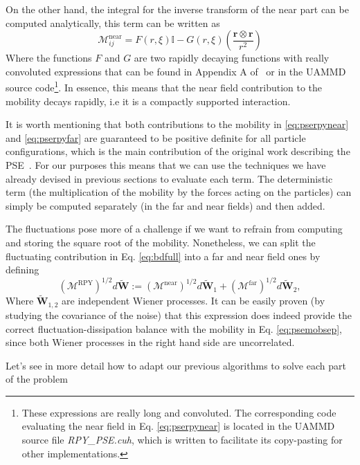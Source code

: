 \documentclass[twoside,openright,titlepage,numbers=noenddot,%
headinclude,footinclude,cleardoublepage=empty,abstract=on,
BCOR=5mm,fontsize=11pt, dvipsnames, paper=b5
]{scrreprt}
\renewcommand{\vec}[1]{\bm{#1}}
\newcommand{\tens}[1]{\bm{\mathcal{#1}}}
\newcommand{\uammd}{\gls{UAMMD}\xspace}
\newcommand{\near}{\textrm{near}}
\newcommand{\far}{\textrm{far}}
\newcommand{\noise}{\widetilde{W}}
\begin{document}
On the other hand, the integral for the inverse transform of the near part can be computed analytically, this term can be written as
\begin{equation}
  \label{eq:pserpynear}
  \tens{M}_{ij}^{\near}= F(r,\xi)\mathbb I - G(r,\xi)\left(\frac{\vec{r}\otimes\vec{r}}{r^2}\right)
\end{equation}
Where the functions $F$ and $G$ are two rapidly decaying functions with really convoluted expressions that can be found in Appendix A of~\cite{Fiore2017} or in the \uammd source code\footnote{These expressions are really long and convoluted. The corresponding code evaluating the near field in Eq. \eqref{eq:pserpynear} is located in the \uammd source file \emph{RPY\_PSE.cuh}, which is written to facilitate its copy-pasting for other implementations.}. In essence, this means that the near field contribution to the mobility decays rapidly, i.e it is a compactly supported interaction.

It is worth mentioning that both contributions to the mobility in \eqref{eq:pserpynear} and \eqref{eq:pserpyfar} are guaranteed to be positive definite for all particle configurations, which is the main contribution of the original work describing the \gls{PSE}~\cite{Fiore2017}.
For our purposes this means that we can use the techniques we have already devised in previous sections to evaluate each term. The deterministic term (the multiplication of the mobility by the forces acting on the particles) can simply be computed separately (in the far and near fields) and then added.

The fluctuations pose more of a challenge if we want to refrain from computing and storing the square root of the mobility. Nonetheless, we can split the fluctuating contribution in Eq. \eqref{eq:bdfull} into a far and near field ones by defining
\begin{equation}
  \label{eq:psenoise}
  (\tens{M}^{\textrm{RPY}})^{1/2} d\vec{\noise} :=  (\tens{M}^{\near})^{1/2} d\vec{\noise}_1 + (\tens{M}^{\far})^{1/2} d\vec{\noise}_2,
\end{equation}
Where $\vec{\noise}_{1,2}$ are independent Wiener processes. It can be easily proven (by studying the covariance of the noise) that this expression does indeed provide the correct fluctuation-dissipation balance with the mobility in Eq. \eqref{eq:psemobsep}, since both Wiener processes in the right hand side are uncorrelated. 

Let's see in more detail how to adapt our previous algorithms to solve each part of the problem
\end{document}
